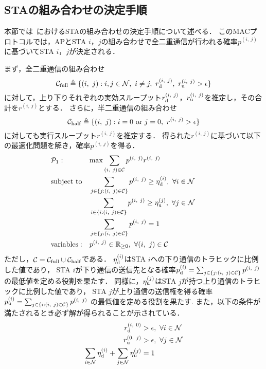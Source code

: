 \documentclass[technicalreport]{ieicej}
\newcommand{\sij}{(i,\ j)}
\newcommand{\mN}{{\mathcal N}}
\newcommand{\pij}{p^{(i,\ j)}}
\newcommand{\rd}{r^{\sij}_{\rm d}}
\newcommand{\ru}{r^{\sij}_{\rm u}}
\newcommand{\rij}{r^{\sij}}
\begin{document}
	\subsection{STAの組み合わせの決定手順}\label{sec:promac}
		本節では~\cite{promac}におけるSTAの組み合わせの決定手順について述べる．
		このMACプロトコルでは，APとSTA $i$，$j$の組み合わせで全二重通信が行われる確率$\pij$に基づいてSTA $i$，$j$が決定される．
		\par
		まず，全二重通信の組み合わせ
		\begin{equation}
			{\mathcal C}_{\rm full} \triangleq \{\sij : i,j\in{\mathcal N},\ i\neq j,\ r^{\sij}_{\rm d},\ r^{\sij}_{\rm u}>\epsilon\}
		\end{equation}
		に対して，上り下りそれぞれの実効スループット$\rd$，$\ru$を推定し，その合計を$\rij$とする．
		さらに，半二重通信の組み合わせ
		\begin{equation}
			{\mathcal C}_{\rm half} \triangleq \{\sij : i=0\ {\rm or}\ j=0,\ \rij >\epsilon\}
		\end{equation}
		に対しても実行スループット$\rij$を推定する．
		得られた$\rij$に基づいて以下の最適化問題を解き，確率$\pij$を得る．
		\begin{align}
			&{\mathcal P}_1: && {\rm max} \sum_{(i,\ j)\in{\mathcal C}} p^{(i,\ j)}r^{(i,\ j)} &&&&&& \label{eq:p1}\\
			&{\rm subject\ to} && \sum_{j\in\{j:(i,\ j)\in{\mathcal C}\}} p^{(i,\ j)} \geq \eta_{\rm d}^{(i)},\ \forall i\in {\mathcal N}  \\
			&&& \sum_{i\in\{i:(i,\ j)\in{\mathcal C}\}} p^{(i,\ j)} \geq \eta_{\rm u}^{(j)},\ \forall j\in {\mathcal N} \label{eq:pu}\\
			&&& \sum_{j\in\{j:(i,\ j)\in{\mathcal C}\}} p^{(i,\ j)}=1 \\
			&{\rm variables:} &&p^{(i,\ j)} \in {\mathbb R}_{\geq 0},\ \forall(i,\ j)\in {\mathcal C}
		\end{align}
		ただし，${\mathcal C} = {\mathcal C}_{\rm full} \cup {\mathcal C}_{\rm half}$である．
		$\eta_{\rm d}^{(i)}$はSTA $i$への下り通信のトラヒックに比例した値であり，
		STA $i$が下り通信の送信先となる確率$p_{\rm d}^{(i)}=\sum_{j\in\{j:(i,\ j)\in{\mathcal C}\}} p^{(i,\ j)}$
		の最低値を定める役割を果たす．
		同様に，$\eta_{\rm u}^{(j)}$はSTA $j$が持つ上り通信のトラヒックに比例した値であり，
		STA $j$が上り通信の送信権を得る確率$p_{\rm u}^{(i)}=\sum_{j\in\{i:(i,\ j)\in{\mathcal C}\}} p^{(i,\ j)}$
		の最低値を定める役割を果たす.
		また，以下の条件が満たされるとき必ず解が得られることが示されている．
		\begin{align}
			r_{\rm d}^{(i,\ 0)} &>\epsilon,\ \forall i\in\mN \\
			r_{\rm u}^{(0,\ j)} &>\epsilon,\ \forall j\in\mN \\
			\sum_{i\in\mN}\eta_{\rm d}^{(i)} + \sum_{j\in\mN}\eta_{\rm u}^{(j)} &=1 \label{eq:feasible}
		\end{align}
\end{document}
